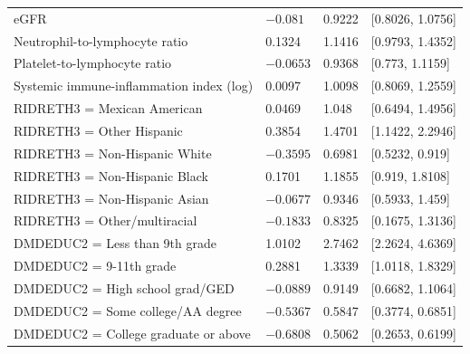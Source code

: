 \documentclass[11pt]{article}
\begin{document}
\begin{longtable}{p{6.2cm}R{2.6cm}R{2cm}R{3.2cm}}
eGFR & $-0.081$ & 0.9222 & [0.8026, 1.0756] \\
Neutrophil-to-lymphocyte ratio & 0.1324 & 1.1416 & [0.9793, 1.4352] \\
Platelet-to-lymphocyte ratio & $-0.0653$ & 0.9368 & [0.773, 1.1159] \\
Systemic immune-inflammation index (log) & 0.0097 & 1.0098 & [0.8069, 1.2559] \\
RIDRETH3 = Mexican American & 0.0469 & 1.048 & [0.6494, 1.4956] \\
RIDRETH3 = Other Hispanic & 0.3854 & 1.4701 & [1.1422, 2.2946] \\
RIDRETH3 = Non-Hispanic White & $-0.3595$ & 0.6981 & [0.5232, 0.919] \\
RIDRETH3 = Non-Hispanic Black & 0.1701 & 1.1855 & [0.919, 1.8108] \\
RIDRETH3 = Non-Hispanic Asian & $-0.0677$ & 0.9346 & [0.5933, 1.459] \\
RIDRETH3 = Other/multiracial & $-0.1833$ & 0.8325 & [0.1675, 1.3136] \\
DMDEDUC2 = Less than 9th grade & 1.0102 & 2.7462 & [2.2624, 4.6369] \\
DMDEDUC2 = 9-11th grade & 0.2881 & 1.3339 & [1.0118, 1.8329] \\
DMDEDUC2 = High school grad/GED & $-0.0889$ & 0.9149 & [0.6682, 1.1064] \\
DMDEDUC2 = Some college/AA degree & $-0.5367$ & 0.5847 & [0.3774, 0.6851] \\
DMDEDUC2 = College graduate or above & $-0.6808$ & 0.5062 & [0.2653, 0.6199] \\
\end{longtable}
\end{document}
